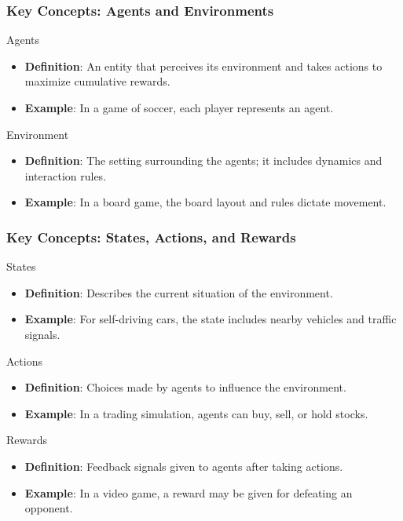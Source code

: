\documentclass[aspectratio=169]{beamer}
\begin{document}
\begin{frame}[fragile]
    \frametitle{Key Concepts: Agents and Environments}
    \begin{block}{Agents}
        \begin{itemize}
            \item \textbf{Definition}: An entity that perceives its environment and takes actions to maximize cumulative rewards.
            \item \textbf{Example}: In a game of soccer, each player represents an agent.
        \end{itemize}
    \end{block}
    
    \begin{block}{Environment}
        \begin{itemize}
            \item \textbf{Definition}: The setting surrounding the agents; it includes dynamics and interaction rules.
            \item \textbf{Example}: In a board game, the board layout and rules dictate movement.
        \end{itemize}
    \end{block}
\end{frame}

\begin{frame}[fragile]
    \frametitle{Key Concepts: States, Actions, and Rewards}
    \begin{block}{States}
        \begin{itemize}
            \item \textbf{Definition}: Describes the current situation of the environment.
            \item \textbf{Example}: For self-driving cars, the state includes nearby vehicles and traffic signals.
        \end{itemize}
    \end{block}
    
    \begin{block}{Actions}
        \begin{itemize}
            \item \textbf{Definition}: Choices made by agents to influence the environment.
            \item \textbf{Example}: In a trading simulation, agents can buy, sell, or hold stocks.
        \end{itemize}
    \end{block}

    \begin{block}{Rewards}
        \begin{itemize}
            \item \textbf{Definition}: Feedback signals given to agents after taking actions.
            \item \textbf{Example}: In a video game, a reward may be given for defeating an opponent.
        \end{itemize}
    \end{block}
\end{frame}
\end{document}
